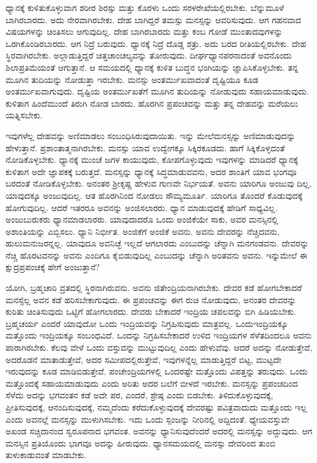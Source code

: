 ಧ್ಯಾನಕ್ಕೆ ಕುಳಿತುಕೊಳ್ಳುವಾಗ ಶರೀರ ಶಿರಸ್ಸು ಮತ್ತು ಕೊರಳು ಒಂದು ಸರಳರೇಖೆಯಲ್ಲಿರಬೇಕು. ಬೆನ್ನುಮೂಳೆ ಬಾಗಿರಬಾರದು. ಅದು ನೇರವಾಗಿರಬೇಕು. ದೇಹ ಬಾಗಿದ್ದರೆ ತಮಸ್ಸು ಮನಸ್ಸನ್ನು ಆವರಿಸುವುದು. ಆಗ ಗಹನವಾದ ವಿಷಯಗಳನ್ನು ಚಿಂತಿಸಲು ಆಗುವುದಿಲ್ಲ. ದೇಹ ಬಾಗಿರಬಾರದು ಮತ್ತು ಕಂಬ ಗೋಡೆ ಮುಂತಾದವುಗಳನ್ನು ಒರಗಿಕೊಂಡಿರಬಾರದು. ಆಗ ನಿದ್ರೆ ಬರುವುದು. ಧ್ಯಾನಕ್ಕೆ ನಿದ್ರೆ ದೊಡ್ಡ ಶತ್ರು. ಅದು ಬರದ ರೀತಿಯಲ್ಲಿರಬೇಕು. ದೇಹ ಸ್ಥಿರವಾಗಿರಬೇಕು. ಅಲ್ಲಾಡುತ್ತಿದ್ದರೆ ಚಿತ್ತಚಾಂಚಲ್ಯವನ್ನು ತೋರುವುದು. ದೀರ್ಘಧ್ಯಾನಪರನಾದಂತೆ ಅವನೊಂದು ಶಿಲಾಪ್ರತಿಮೆಯಂತೆ ಆಗುತ್ತಾನೆ. ಆ ಸಮಯದಲ್ಲಿ ಧ್ಯಾನಕ್ಕೆ ಕುಳಿತ ಬುದ್ಧನ ಭಂಗಿಯನ್ನು ಜ್ಞಾಪಿಸಿಕೊಳ್ಳಬೇಕು. ತನ್ನ ಮೂಗಿನ ತುದಿಯನ್ನು ನೋಡುತ್ತಾ ಇರಬೇಕು. ಮನಸ್ಸು ಅಂತರ್ಮುಖವಾದಂತೆ ದೃಷ್ಟಿಯೂ ಕೂಡ ಅಂತರ್ಮುಖವಾಗುವುದು. ದೃಷ್ಟಿಯ ಅಂತರ್ಮುಖತೆಗೆ ಮೂಗಿನ ತುದಿಯನ್ನು ನೋಡುವುದು ಸಹಾಯಮಾಡುವುದು. ಕುಳಿತಾಗ ಹಿಂದೆಮುಂದೆ ತಿರುಗಿ ನೋಡ ಬಾರದು. ಹೊರಗಿನ ಪ್ರಪಂಚವನ್ನು ಮತ್ತು ತನ್ನ ದೇಹವನ್ನು ಮರೆಯಲು ಯತ್ನಿಸಬೇಕು.

ಇವುಗಳೆಲ್ಲ ದೇಹವನ್ನು ಅಣಿಮಾಡಲು ಸಂಬಂಧಿಸಿರುವುದಾಯಿತು. ಇನ್ನು ಮೇಲೆ\break ಮನಸ್ಸನ್ನು ಅಣಿಮಾಡುವುದನ್ನು ಹೇಳುತ್ತಾನೆ. ಪ್ರಶಾಂತಾತ್ಮನಾಗಿರಬೇಕು. ಮನಸ್ಸು ಯಾವ ಉದ್ವೇಗಕ್ಕೂ ಸಿಕ್ಕಿರಕೂಡದು. ಹಾಗೆ ಸಿಕ್ಕಿಕೊಳ್ಳದಂತೆ ನೋಡಿಕೊಳ್ಳಬೇಕು. ಧ್ಯಾನಕ್ಕೆ ಮುಂಚೆ ಜಗಳ ಕಾಯುವುದು, ಕೋಪಗೊಳ್ಳುವುದು ಇವುಗಳನ್ನು ಮಾಡಿದರೆ ಧ್ಯಾನಕ್ಕೆ ಕುಳಿತಾಗ ಅದೇ ಜ್ಞಾಪಕಕ್ಕೆ ಬರುತ್ತದೆ. ಮನಸ್ಸನ್ನು ಧ್ಯಾನಕ್ಕೆ ಸಿದ್ಧಮಾಡುವವನು, ಅದರ ಶಾಂತಿಗೆ ಯಾವ ಭಂಗವೂ ಬರದಂತೆ ನೋಡಿಕೊಳ್ಳಬೇಕು. ಅನಂತರ ಶ‍್ರೀಕೃಷ್ಣ ಹೇಳುವ ಗುಣವೇ ನಿರ್ಭಯತೆ. ಅವನು ಯಾರಿಗೂ ಅಂಜುವು ದಿಲ್ಲ, ಯಾವುದಕ್ಕೂ ಅಂಜುವುದಿಲ್ಲ. ಆತ ಹೊರಗಿನಿಂದ ನೋಡಲು ಸೌಮ್ಯಮೂರ್ತಿ. ಯಾರಿಗೂ ತೊಂದರೆ ಕೊಡುವುದಕ್ಕೆ ಹೋಗುವುದಿಲ್ಲ. ಆದರೆ ಇತರರೂ ಅವನನ್ನು ಅಂಜಿಸಲಾರರು. ಧ್ಯಾನ ಮಾಡುವುದಕ್ಕೆ ಹೇಡಿಗೆ ಸಾಧ್ಯವಿಲ್ಲ. ಅಂಜುಬುರುಕರು ಧ್ಯಾನಮಾಡಲಾರರು. ಯಾವುದಾದರೊ ಒಂದು ಅಂಜಿಕೆಯೇ ಸಾಕು, ಅವರ ಮನಸ್ಸಿನಲ್ಲಿ ಅಶಾಂತಿಯನ್ನು ಎಬ್ಬಿಸಲು. ಧ್ಯಾನಿ ನಿರ್ಭೀತ. ಅಂಜಿಕೆಗೆ ಅಂಜಿಕೆ ಅವನು. ಅವನು ದೇವರನ್ನು ನೆಚ್ಚಿದವನು, ಹುಲುಮನುಜರನ್ನಲ್ಲ. ಯಾವುದೂ ಅವನಿಚ್ಛೆ ಇಲ್ಲದೆ ಆಗಲಾರದು ಎಂಬುದನ್ನು ಚೆನ್ನಾಗಿ ಮನಗಂಡವನು. ದೇವರನ್ನು ನೆಚ್ಚಿ ಹೊರಟವನನ್ನು ಅವನು ಎಂದಿಗೂ ಕೈಬಿಡುವುದಿಲ್ಲ ಎಂಬುದನ್ನು ಚೆನ್ನಾಗಿ ಅರಿತವನು ಅವನು. ಇನ್ನುಮೇಲೆ ಈ ಕ್ಷುದ್ರಪ್ರಪಂಚಕ್ಕೆ ಹೇಗೆ ಅಂಜುತ್ತಾನೆ?

ಯೋಗಿ, ಬ್ರಹ್ಮಚಾರಿ ವ್ರತದಲ್ಲಿ ಸ್ಥಿರನಾಗಿರುವನು. ಅವನು ಜಿತೇಂದ್ರಿಯನಾಗಿರಬೇಕು. ದೇವರ ಕಡೆ ಹೋಗಬೇಕಾದರೆ ಮನಸ್ಸೆಲ್ಲ ಅವನ ಕಡೆ ಹರಿಸಬೇಕಾಗುವುದು. ಈ ಪ್ರಪಂಚವನ್ನು ಈಗ ರುಚಿ ನೋಡುವುದು, ಅನಂತರ ದೇವರನ್ನು ಕುರಿತು ಚಿಂತಿಸುವುದು ಒಟ್ಟಿಗೆ ಹೋಗಲಾರದು. ದೇವರು ಬೇಕಾದರೆ ಇಂದ್ರಿಯ ಚಪಲವನ್ನು ಬಿಗಿ ಹಿಡಿಯಬೇಕು. ಬ್ರಹ್ಮಚರ್ಯ ಎಂದರೆ ಯಾವುದೋ ಒಂದು ಇಂದ್ರಿಯವನ್ನು ನಿಗ್ರಹಿಸುವುದು ಮಾತ್ರವಲ್ಲ. ಒಂದು\break ಇಂದ್ರಿಯಕ್ಕೂ ಮತ್ತೊಂದು ಇಂದ್ರಿಯಕ್ಕೂ ಸಂಬಂಧವಿದೆ. ಒಂದನ್ನು ನಿಗ್ರಹಿಸಬೇಕಾದರೆ ಉಳಿದ ಇಂದ್ರಿಯಗಳ ಸೆಳೆತದಿಂದಲೂ ಅವನು ಪಾರಾಗಿರಬೇಕು. ಕೆಲವು ವೇಳೆ ಒಂದು ವಸ್ತುವನ್ನು ಮುಟ್ಟುವುದಿಲ್ಲ ಎಂದು ಹೇಳುವೆವು. ಆದರೆ ಅದನ್ನು ನೋಡುತ್ತೇವೆ, ಅದರೊಡನೆ ಮಾತಾಡುತ್ತೇವೆ, ಅದರ ಸಮೀಪದಲ್ಲಿರುತ್ತೇವೆ, ಇವುಗಳನ್ನೆಲ್ಲ ಮಾಡುತ್ತಿದ್ದರೆ ಬಿಟ್ಟ, ಮುಟ್ಟದೇ ಇರುವುದನ್ನು ಕೂಡ ಮಾಡಿಬಿಡುತ್ತೇವೆ. ಪಂಚೇಂದ್ರಿಯಗಳಲ್ಲಿ ಒಂದರಷ್ಟೇ ಮತ್ತೊಂದು ವಿಪತ್ತನ್ನು ತರುವುದು. ಒಂದು ಮತ್ತೊಂದಕ್ಕೆ ಸಹಾಯಮಾಡುವುದು ಎಂದು ಅರಿತು ಅದರ ಬಲೆಗೆ ಬೀಳದೆ ಇರಬೇಕು. ಮನಸ್ಸನ್ನು ಪ್ರಪಂಚದಿಂದ ಸೆಳೆದು ಅದನ್ನು ಭಗವಂತನ ಕಡೆ ಅದೇ ಪರ, ಎಂದರೆ, ಶ್ರೇಷ್ಠ ಎಂದು ಬಿಡಬೇಕು. ತಿಳಿದುಕೊಳ್ಳುವುದಕ್ಕೆ, ಪ್ರೀತಿಸುವುದಕ್ಕೆ, ಆನಂದಿಸುವುದಕ್ಕೆ, ನಮ್ಮದೆಂದು ಕರೆದುಕೊಳ್ಳುವುದಕ್ಕೆ ದೇವರಷ್ಟು ಪವಿತ್ರವಾದುದು ಮತ್ತೊಂದು ಇಲ್ಲ ಎಂದು ಅವನಲ್ಲೆ ಮನಸ್ಸನ್ನು ಮುಳುಗಿಸಬೇಕು. ಇದು ಒಂದು ಸ್ಪಂಜನ್ನು ನೀರಿನಲ್ಲಿ ಅದ್ದಿದಂತೆ. ಧ್ಯೇಯವಸ್ತುವೇ ಅಖಂಡ ಸಚ್ಚಿದಾನಂದ ಸ್ವರೂಪನಾದ ಭಗವಂತ. ಅವನನ್ನು ಧ್ಯಾನಿಸುವುದೆಂದರೆ ಅದರಲ್ಲಿ ಮನಸ್ಸನ್ನು ಅದ್ದುವುದು. ಆಗ ಮನಸ್ಸಿನ ಪ್ರತಿಯೊಂದು ಭಾಗವೂ ಅದನ್ನು ಹೀರುವುದು. ಧ್ಯಾನಸಮಯದಲ್ಲಿ ಮನಸ್ಸು ದೇವರಿಂದ ತುಂಬಿ ತುಳುಕಾಡುವಂತೆ ಮಾಡಬೇಕು.

